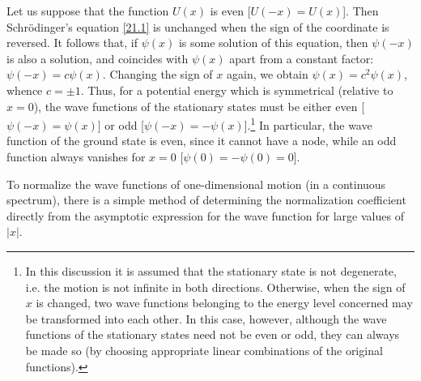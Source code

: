 Let us suppose that the function $ U (x) $ is even [$ U (−x) = U (x) $]. Then Schr\"odinger's equation \eqref{21.1} is unchanged when the sign of the coordinate is reversed. It follows that, if $\psi(x)$ is some solution of this equation, then $\psi(-x)$ is also a solution, and coincides with $\psi(x)$ apart from a constant factor: $ \psi(-x)= c\psi(x) $. Changing the sign of $ x $ again, we obtain $ \psi(x)=c^2\psi(x) $, whence $ c = \pm1 $. Thus, for a potential energy which is symmetrical (relative to $ x = 0 $), the wave functions of the stationary states must be either even [$ \psi(-x)=\psi(x) $] or odd [$ \psi(-x)=-\psi(x) $].\footnote{In this discussion it is assumed that the stationary state is not degenerate, i.e. the motion is not infinite in both directions. Otherwise, when the sign of $ x $ is changed, two wave functions belonging to the energy level concerned may be transformed into each other. In this case, however, although the wave functions of the stationary states need not be even or odd, they can always be made so (by choosing appropriate linear combinations of the original functions).} In particular, the wave function of the ground state is even, since it cannot have a node, while an odd function always vanishes for $ x = 0 $ [$ \psi(0)=-\psi(0)=0 $].

To normalize the wave functions of one-dimensional motion (in a continuous spectrum), there is a simple method of determining the normalization coefficient directly from the asymptotic expression for the wave function for large values of $ \lvert x\rvert $.


